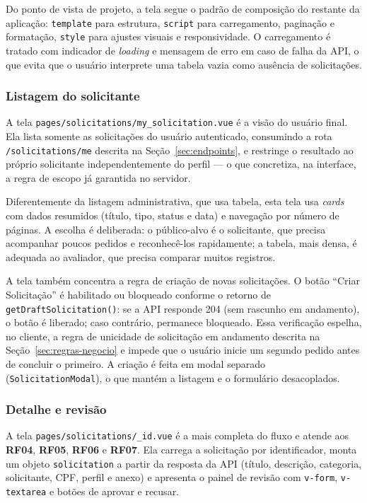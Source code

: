 Do ponto de vista de projeto, a tela segue o padrão de composição do restante da aplicação:
\texttt{template} para estrutura, \texttt{script} para carregamento, paginação e formatação,
\texttt{style} para ajustes visuais e responsividade. O carregamento é tratado com indicador de
\textit{loading} e mensagem de erro em caso de falha da API, o que evita que o usuário
interprete uma tabela vazia como ausência de solicitações.




\subsubsection{Listagem do solicitante}
\label{subsubsec:listagem-solicitante}
A tela \texttt{pages/solicitations/my\_solicitation.vue} é a visão do usuário final. Ela
lista somente as solicitações do usuário autenticado, consumindo a rota
\texttt{/solicitations/me} descrita na Seção~\ref{sec:endpoints}, e restringe o resultado ao próprio
solicitante independentemente do perfil --- o que concretiza, na interface, a regra de
escopo já garantida no servidor.


Diferentemente da listagem administrativa, que usa tabela, esta tela usa \textit{cards}
com dados resumidos (título, tipo, status e data) e navegação por número de páginas. A
escolha é deliberada: o público-alvo é o solicitante, que precisa acompanhar poucos
pedidos e reconhecê-los rapidamente; a tabela, mais densa, é adequada ao avaliador, que
precisa comparar muitos registros.

A tela também concentra a regra de criação de novas solicitações. O botão ``Criar
Solicitação'' é habilitado ou bloqueado conforme o retorno de
\texttt{getDraftSolicitation()}: se a API responde 204 (sem rascunho em andamento), o
botão é liberado; caso contrário, permanece bloqueado. Essa verificação espelha, no
cliente, a regra de unicidade de solicitação em andamento descrita na Seção~\ref{sec:regras-negocio} e
impede que o usuário inicie um segundo pedido antes de concluir o primeiro. A criação é
feita em modal separado (\texttt{SolicitationModal}), o que mantém a listagem e o
formulário desacoplados.

\subsubsection{Detalhe e revisão}
\label{subsubsec:frontend-detalhe}
A tela \texttt{pages/solicitations/\_id.vue} é a mais completa do fluxo e atende aos
\textbf{RF04}, \textbf{RF05}, \textbf{RF06} e \textbf{RF07}. Ela carrega a solicitação por identificador, monta um objeto
\texttt{solicitation} a partir da resposta da API (título, descrição, categoria,
solicitante, CPF, perfil e anexo) e apresenta o painel de revisão com \texttt{v-form},
\texttt{v-textarea} e botões de aprovar e recusar.

